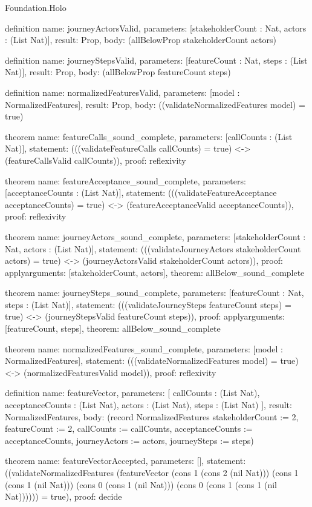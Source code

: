\begin{lexlean}{Foundation.Holo}
\begin{semanticmodule}
definition{
  name: journeyActorsValid,
  parameters: [stakeholderCount : Nat, actors : (List Nat)],
  result: Prop,
  body: (allBelowProp stakeholderCount actors)
}

definition{
  name: journeyStepsValid,
  parameters: [featureCount : Nat, steps : (List Nat)],
  result: Prop,
  body: (allBelowProp featureCount steps)
}

definition{
  name: normalizedFeaturesValid,
  parameters: [model : NormalizedFeatures],
  result: Prop,
  body: ((validateNormalizedFeatures model) = true)
}

theorem{
  name: featureCalls_sound_complete,
  parameters: [callCounts : (List Nat)],
  statement: (((validateFeatureCalls callCounts) = true) <-> (featureCallsValid callCounts)),
  proof: reflexivity{}
}

theorem{
  name: featureAcceptance_sound_complete,
  parameters: [acceptanceCounts : (List Nat)],
  statement: (((validateFeatureAcceptance acceptanceCounts) = true) <-> (featureAcceptanceValid acceptanceCounts)),
  proof: reflexivity{}
}

theorem{
  name: journeyActors_sound_complete,
  parameters: [stakeholderCount : Nat, actors : (List Nat)],
  statement: (((validateJourneyActors stakeholderCount actors) = true) <-> (journeyActorsValid stakeholderCount actors)),
  proof: apply{arguments: [stakeholderCount, actors], theorem: allBelow_sound_complete}
}

theorem{
  name: journeySteps_sound_complete,
  parameters: [featureCount : Nat, steps : (List Nat)],
  statement: (((validateJourneySteps featureCount steps) = true) <-> (journeyStepsValid featureCount steps)),
  proof: apply{arguments: [featureCount, steps], theorem: allBelow_sound_complete}
}

theorem{
  name: normalizedFeatures_sound_complete,
  parameters: [model : NormalizedFeatures],
  statement: (((validateNormalizedFeatures model) = true) <-> (normalizedFeaturesValid model)),
  proof: reflexivity{}
}

definition{
  name: featureVector,
  parameters: [
    callCounts : (List Nat),
    acceptanceCounts : (List Nat),
    actors : (List Nat),
    steps : (List Nat)
  ],
  result: NormalizedFeatures,
  body: (record NormalizedFeatures {stakeholderCount := 2, featureCount := 2, callCounts := callCounts, acceptanceCounts := acceptanceCounts, journeyActors := actors, journeySteps := steps})
}

theorem{
  name: featureVectorAccepted,
  parameters: [],
  statement: ((validateNormalizedFeatures (featureVector (cons 1 (cons 2 (nil Nat))) (cons 1 (cons 1 (nil Nat))) (cons 0 (cons 1 (nil Nat))) (cons 0 (cons 1 (cons 1 (nil Nat)))))) = true),
  proof: decide{}
}


\end{semanticmodule}
\end{lexlean}
